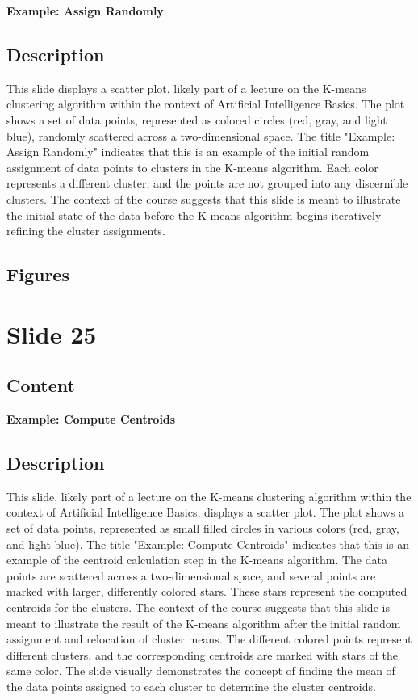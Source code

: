 \documentclass{article}%
\begin{document}
\textbf{Example: Assign Randomly}
%
\subsection{Description}%
This slide displays a scatter plot, likely part of a lecture on the K-means clustering algorithm within the context of Artificial Intelligence Basics.  The plot shows a set of data points, represented as colored circles (red, gray, and light blue), randomly scattered across a two-dimensional space.  The title "Example: Assign Randomly" indicates that this is an example of the initial random assignment of data points to clusters in the K-means algorithm.  Each color represents a different cluster, and the points are not grouped into any discernible clusters.  The context of the course suggests that this slide is meant to illustrate the initial state of the data before the K-means algorithm begins iteratively refining the cluster assignments.%
\subsection{Figures}%
\begin{figure}[H]%
\centering%
\end{figure}

%
\newpage%
\section{Slide 25}%
\label{sec:Slide25}%
\subsection{Content}%

\textbf{Example: Compute Centroids}
%
\subsection{Description}%
This slide, likely part of a lecture on the K-means clustering algorithm within the context of Artificial Intelligence Basics, displays a scatter plot.  The plot shows a set of data points, represented as small filled circles in various colors (red, gray, and light blue).  The title "Example: Compute Centroids" indicates that this is an example of the centroid calculation step in the K-means algorithm.  The data points are scattered across a two-dimensional space, and several points are marked with larger, differently colored stars.  These stars represent the computed centroids for the clusters.  The context of the course suggests that this slide is meant to illustrate the result of the K-means algorithm after the initial random assignment and relocation of cluster means.  The different colored points represent different clusters, and the corresponding centroids are marked with stars of the same color.  The slide visually demonstrates the concept of finding the mean of the data points assigned to each cluster to determine the cluster centroids.%
\end{document}
